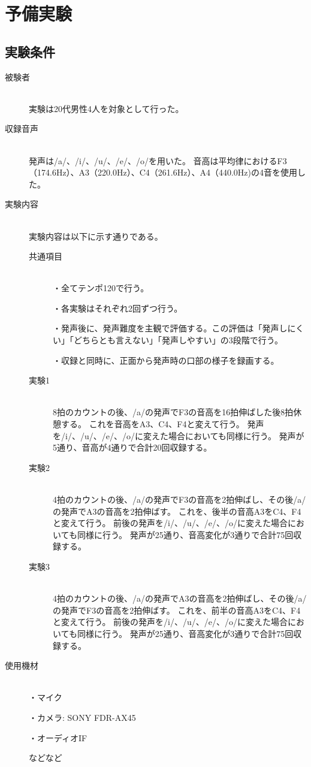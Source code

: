 \documentclass[10ptj,a4j,dvipdfmx,uplatex, oneside, openany]{jsbook}%
\begin{document}
\section{予備実験}
\subsection{実験条件}
\begin{description}
    \item[被験者]\mbox{}\\
        実験は20代男性4人を対象として行った。
    \item[収録音声]\mbox{}\\
        発声は/a/、/i/、/u/、/e/、/o/を用いた。
        音高は平均律におけるF3（174.6Hz）、A3（220.0Hz）、C4（261.6Hz）、A4（440.0Hz)の4音を使用した。
    \item[実験内容]\mbox{}\\
        実験内容は以下に示す通りである。
        \begin{description}
            \item[共通項目]\mbox{}\\
                ・全てテンポ120で行う。
                
                ・各実験はそれぞれ2回ずつ行う。
                
                ・発声後に、発声難度を主観で評価する。この評価は「発声しにくい」「どちらとも言えない」「発声しやすい」の3段階で行う。
                
                ・収録と同時に、正面から発声時の口部の様子を録画する。
            \item[実験1]\mbox{}\\
                8拍のカウントの後、/a/の発声でF3の音高を16拍伸ばした後8拍休憩する。
                これを音高をA3、C4、F4と変えて行う。
                発声を/i/、/u/、/e/、/o/に変えた場合においても同様に行う。
                発声が5通り、音高が4通りで合計20回収録する。
            \item[実験2]\mbox{}\\
                4拍のカウントの後、/a/の発声でF3の音高を2拍伸ばし、その後/a/の発声でA3の音高を2拍伸ばす。
                これを、後半の音高A3をC4、F4と変えて行う。
                前後の発声を/i/、/u/、/e/、/o/に変えた場合においても同様に行う。
                発声が25通り、音高変化が3通りで合計75回収録する。
            \item[実験3]\mbox{}\\
                4拍のカウントの後、/a/の発声でA3の音高を2拍伸ばし、その後/a/の発声でF3の音高を2拍伸ばす。
                これを、前半の音高A3をC4、F4と変えて行う。
                前後の発声を/i/、/u/、/e/、/o/に変えた場合においても同様に行う。
                発声が25通り、音高変化が3通りで合計75回収録する。
        \end{description}

    \item[使用機材]\mbox{}\\
        ・マイク

        ・カメラ: SONY FDR-AX45

        ・オーディオIF

        などなど
\end{description}
\end{document}

